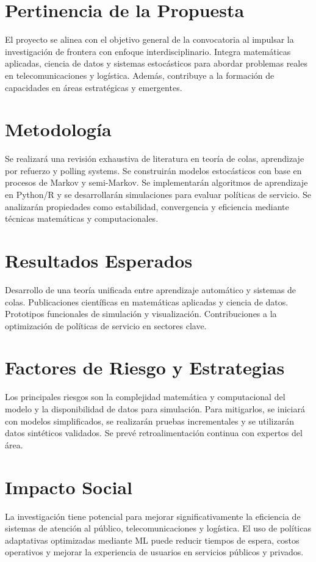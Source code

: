 \documentclass[12pt]{article}
\begin{document}
\section{Pertinencia de la Propuesta}
El proyecto se alinea con el objetivo general de la convocatoria al impulsar la investigación de frontera con enfoque interdisciplinario. Integra matemáticas aplicadas, ciencia de datos y sistemas estocásticos para abordar problemas reales en telecomunicaciones y logística. Además, contribuye a la formación de capacidades en áreas estratégicas y emergentes.

\section{Metodología}
Se realizará una revisión exhaustiva de literatura en teoría de colas, aprendizaje por refuerzo y polling systems. Se construirán modelos estocásticos con base en procesos de Markov y semi-Markov. Se implementarán algoritmos de aprendizaje en Python/R y se desarrollarán simulaciones para evaluar políticas de servicio. Se analizarán propiedades como estabilidad, convergencia y eficiencia mediante técnicas matemáticas y computacionales.

\section{Resultados Esperados}
Desarrollo de una teoría unificada entre aprendizaje automático y sistemas de colas. Publicaciones científicas en matemáticas aplicadas y ciencia de datos. Prototipos funcionales de simulación y visualización. Contribuciones a la optimización de políticas de servicio en sectores clave.

\section{Factores de Riesgo y Estrategias}
Los principales riesgos son la complejidad matemática y computacional del modelo y la disponibilidad de datos para simulación. Para mitigarlos, se iniciará con modelos simplificados, se realizarán pruebas incrementales y se utilizarán datos sintéticos validados. Se prevé retroalimentación continua con expertos del área.

\section{Impacto Social}
La investigación tiene potencial para mejorar significativamente la eficiencia de sistemas de atención al público, telecomunicaciones y logística. El uso de políticas adaptativas optimizadas mediante ML puede reducir tiempos de espera, costos operativos y mejorar la experiencia de usuarios en servicios públicos y privados.
\end{document}
